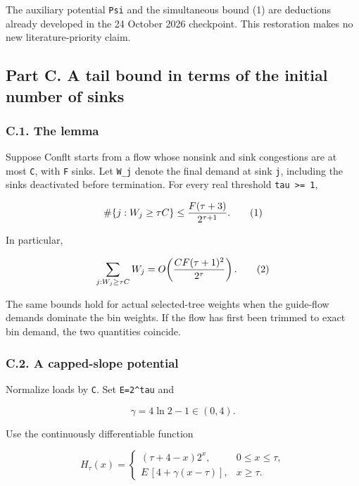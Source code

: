 The auxiliary potential \texttt{Psi} and the simultaneous bound (1) are deductions already developed in the 24 October 2026 checkpoint. This restoration makes no new literature-priority claim.

\hypertarget{af-385fd70686-part-c.-a-tail-bound-in-terms-of-the-initial-number-of-sinks}{%
\subsection{Part C. A tail bound in terms of the initial number of sinks}\label{af-385fd70686-part-c.-a-tail-bound-in-terms-of-the-initial-number-of-sinks}}

\hypertarget{af-385fd70686-c.1.-the-lemma}{%
\subsubsection{C.1. The lemma}\label{af-385fd70686-c.1.-the-lemma}}

Suppose Conflt starts from a flow whose nonsink and sink congestions are at most \texttt{C}, with \texttt{F} sinks. Let \texttt{W\_j} denote the final demand at sink \texttt{j}, including the sinks deactivated before termination. For every real threshold \texttt{tau\ \textgreater{}=\ 1},

\[
\#\{j:W_j\ge \tau C\}
\le {F(\tau+3)\over 2^{\tau+1}}.                 \tag{1}
\]

In particular,

\[
\sum_{j:W_j\ge\tau C}W_j
=O\!\left({CF(\tau+1)^2\over2^\tau}\right).       \tag{2}
\]

The same bounds hold for actual selected-tree weights when the guide-flow demands dominate the bin weights. If the flow has first been trimmed to exact bin demand, the two quantities coincide.

\hypertarget{af-385fd70686-c.2.-a-capped-slope-potential}{%
\subsubsection{C.2. A capped-slope potential}\label{af-385fd70686-c.2.-a-capped-slope-potential}}

Normalize loads by \texttt{C}. Set \texttt{E=2\^{}tau} and

\[
\gamma=4\ln 2-1\in(0,4).
\]

Use the continuously differentiable function

\[
H_\tau(x)=
\begin{cases}
 (\tau+4-x)2^x,&0\le x\le\tau,\\
 E\,[4+\gamma(x-\tau)],&x\ge\tau.
\end{cases}                                      \tag{3}
\]

